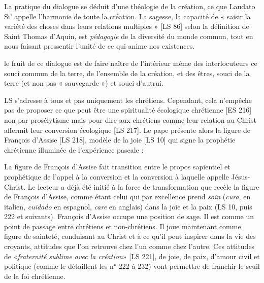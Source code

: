La pratique du dialogue se déduit d’une théologie de la création, ce que Laudato Si’ appelle l’harmonie de toute la création. 
La sagesse, la capacité de « saisir la variété des choses dans leurs relations multiples » [LS 86] selon la définition de Saint Thomas d'Aquin, est \textit{pédagogie} de la diversité du monde commun, tout en nous faisant pressentir l’unité de ce qui anime nos existences.
\begin{singlequote}
    le fruit de ce dialogue est de faire naître de l’intérieur même des interlocuteurs ce souci commun de la terre, de l’ensemble de la création, et des êtres, souci de la terre (et non pas « sauvegarde ») et souci d’autrui. \cite[par. 7]{goujon_laudato_2022}
    \end{singlequote}

LS s'adresse à tous et pas uniquement les chrétiens. 
Cependant, cela n'empêche pas de proposer ce que peut être une spiritualité écologique chrétienne [ES 216] non par prosélytisme mais pour dire aux chrétiens comme leur relation au Christ  affermit leur conversion écologique [LS 217]. 
Le pape présente alors la figure de François d'Assise [LS 218], modèle de la joie  [LS 10] qui signe la prophétie chrétienne illuminée de l'expérience pascale : 



\begin{singlequote}
La figure de François d’Assise fait transition entre le propos sapientiel et prophétique de l’appel à la conversion et la conversion à laquelle appelle Jésus-Christ. Le lecteur a déjà été initié à la force de transformation que recèle la figure de François d’Assise, comme étant celui qui par excellence prend \textit{soin} (\textit{cura}, en italien, \textit{cuidado} en espagnol, \textit{care} en anglais) dans la joie et la paix (LS 10, puis 222 et suivants). François d’Assise occupe une position de sage. Il est comme un point de passage entre chrétiens et non-chrétiens. Il joue maintenant comme figure de sainteté, conduisant au Christ et à ce qu’il peut inspirer dans la vie des croyants, attitudes que l’on retrouve chez l’un comme chez l’autre. Ces attitudes de «\textit{fraternité sublime avec la création}» [LS 221], de joie, de paix, d’amour civil et politique (comme le détaillent les n° 222 à 232) vont permettre de franchir le seuil de la foi chrétienne. \cite[par. 10]{goujon_laudato_2022}\end{singlequote}

